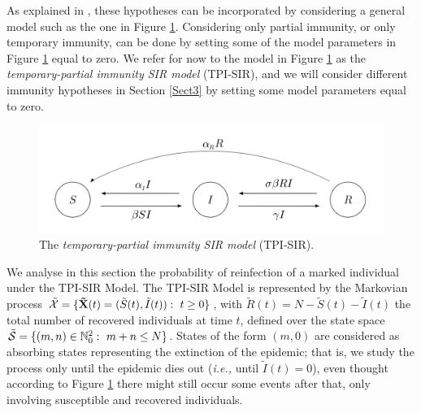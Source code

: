 \documentclass[preprint,12pt]{elsarticle}
\begin{document}
\par\noindent As explained in \cite[Figure 1(e)]{gomes2004infection}, these hypotheses can be incorporated by considering a general model such as the one in Figure
\ref{fig:4}. Considering only partial immunity, or only temporary immunity, can be done by setting some of the model parameters in Figure \ref{fig:4} equal to zero. We refer for now to the model in Figure \ref{fig:4} as the {\it temporary-partial immunity SIR model} (TPI-SIR), and we will consider different immunity hypotheses in Section \ref{Sect3} by setting some model parameters equal to zero.
\begin{figure}
\centering
 \includegraphics[width=\textwidth]{Figure4.jpg}
\caption{The {\it temporary-partial immunity SIR model} (TPI-SIR).}
\label{fig:4}
\end{figure}

\par We analyse in this section the probability of reinfection of a marked individual under the TPI-SIR Model. The TPI-SIR Model is represented by the Markovian
process ${\cal \tilde X}=\{{\bf \tilde X}(t)=({\tilde S}(t),{\tilde I}(t)):\ t\geq0\}$, with ${\tilde R}(t)=N-{\tilde S}(t)-{\tilde I}(t)$ the total
number of recovered individuals at time $t$, defined over the state space ${\cal \tilde S}=\{(m,n)\in\mathbb{N}^2_0: \ m+n\leq N\}$.
States of the form $(m,0)$ are considered as absorbing states representing the extinction of the epidemic; that is, we study the process only until
the epidemic dies out ({\it i.e.,} until ${\tilde I}(t)=0$), even thought according to Figure \ref{fig:4} there might still occur some events after that, only involving susceptible and recovered individuals.
\end{document}
